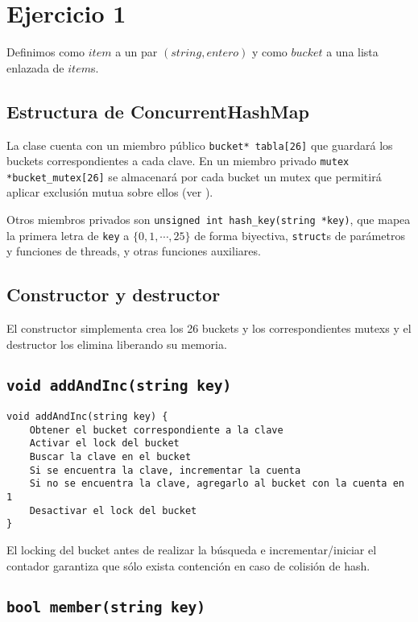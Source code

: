 \section{Ejercicio 1}

Definimos como $item$ a un par $(string, entero)$ y como $bucket$ a una lista enlazada de $item$s.


\subsection{Estructura de ConcurrentHashMap}

La clase cuenta con un miembro público \texttt{bucket* tabla[26]} que guardará los buckets correspondientes a cada clave. En un miembro privado \texttt{mutex *bucket_mutex[26]} se almacenará por cada bucket un mutex que permitirá aplicar exclusión mutua sobre ellos (ver \cite{cppref-mutex}).

Otros miembros privados son \texttt{unsigned int hash_key(string *key)}, que mapea la primera letra de \texttt{key} a $\{ 0, 1, \cdots, 25 \}$ de forma biyectiva, \texttt{struct}s de parámetros y funciones de threads, y otras funciones auxiliares.


\subsection{Constructor y destructor}

El constructor simplementa crea los 26 buckets y los correspondientes mutexs y el destructor los elimina liberando su memoria.


\subsection{\texttt{void addAndInc(string key)}}

\begin{verbatim}
void addAndInc(string key) {
	Obtener el bucket correspondiente a la clave
	Activar el lock del bucket
	Buscar la clave en el bucket
	Si se encuentra la clave, incrementar la cuenta
	Si no se encuentra la clave, agregarlo al bucket con la cuenta en 1
	Desactivar el lock del bucket
}
\end{verbatim}

El locking del bucket antes de realizar la búsqueda e incrementar/iniciar el contador garantiza que sólo exista contención en caso de colisión de hash.


\subsection{\texttt{bool member(string key)}}


